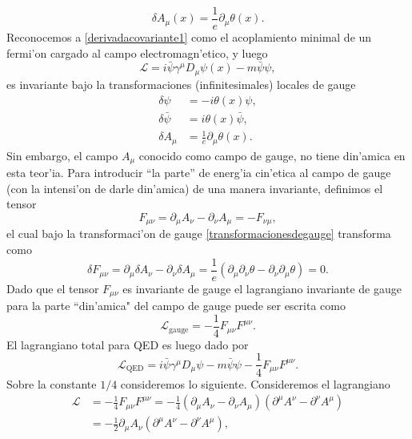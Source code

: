 \begin{equation}
\delta A_\mu(x)=\frac{1}{e}\partial_\mu\theta(x).
\end{equation}
Reconocemos a \eqref{derivadacovariante1} como el acoplamiento minimal de un fermi'on cargado al campo electromagn'etico, y luego
\begin{equation}
\mathcal{L}=i\bar{\psi}\gamma^\mu D_\mu\psi(x)-m\bar{\psi}\psi,
\end{equation}
es invariante bajo la transformaciones (infinitesimales) locales  de gauge
\begin{equation}
\begin{aligned} \label{transformacionesdegauge}
\delta\psi&=-i\theta(x)\psi, \\
\delta\bar{\psi}&=i\theta(x)\bar{\psi},\\
\delta A_\mu&=\frac{1}{e}\partial_\mu\theta(x).
\end{aligned}
\end{equation}
Sin embargo, el campo $A_\mu$ conocido como campo de gauge, no tiene din'amica en esta teor'ia. Para introducir ``la parte''  de energ'ia cin'etica al campo de gauge (con la intensi'on de darle din'amica) de una manera invariante, definimos el tensor 
\begin{equation}\label{tensorfmunu}
F_{\mu\nu}=\partial_\mu A_\nu-\partial_\nu A_\mu=-F_{\nu\mu},
\end{equation} 
el cual bajo la transformaci'on de gauge \eqref{transformacionesdegauge} transforma como
\begin{equation}
\delta F_{\mu\nu} =\partial_\mu \delta A_\nu-\partial_\nu \delta A_\mu = \frac{1}{e}(\partial_\mu\partial_\nu\theta-\partial_\nu\partial_\mu\theta)=0.
\end{equation}
Dado que el tensor $F_{\mu\nu}$ es invariante de gauge  el lagrangiano invariante de gauge para la parte ``din'amica" del campo de gauge puede ser escrita como
\begin{equation}
\mathcal{L}_{\text{gauge}}=-\frac{1}{4}F_{\mu\nu}F^{\mu\nu}.
\end{equation}
El lagrangiano total para QED es luego dado por
\begin{equation}
\mathcal{L}_{\text{QED}}=i\bar{\psi}\gamma^\mu D_\mu \psi-m\bar{\psi}\psi-\frac{1}{4}F_{\mu\nu}F^{\mu\nu}.
\end{equation}
Sobre la constante $1/4$ consideremos lo siguiente. Consideremos el lagrangiano
\begin{equation}
\begin{aligned}\label{ecuaciones9.16}
\mathcal{L}&=-\frac{1}{4}F_{\mu\nu}F^{\mu\nu}=-\frac{1}{4}(\partial_\mu A_\nu-\partial_\nu A_\mu)(\partial^\mu A^\nu-\partial^\nu A^\mu) \\
&=-\frac{1}{2}\partial_\mu A_\nu(\partial^\mu A^\nu-\partial^\nu A^\mu),
\end{aligned}
\end{equation}
